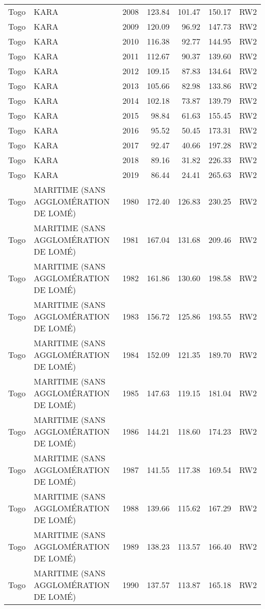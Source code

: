 \begin{longtable}{lllrrrl}
  Togo & KARA & 2008 & 123.84 & 101.47 & 150.17 & RW2 \\ 
  Togo & KARA & 2009 & 120.09 & 96.92 & 147.73 & RW2 \\ 
  Togo & KARA & 2010 & 116.38 & 92.77 & 144.95 & RW2 \\ 
  Togo & KARA & 2011 & 112.67 & 90.37 & 139.60 & RW2 \\ 
  Togo & KARA & 2012 & 109.15 & 87.83 & 134.64 & RW2 \\ 
  Togo & KARA & 2013 & 105.66 & 82.98 & 133.86 & RW2 \\ 
  Togo & KARA & 2014 & 102.18 & 73.87 & 139.79 & RW2 \\ 
  Togo & KARA & 2015 & 98.84 & 61.63 & 155.45 & RW2 \\ 
  Togo & KARA & 2016 & 95.52 & 50.45 & 173.31 & RW2 \\ 
  Togo & KARA & 2017 & 92.47 & 40.66 & 197.28 & RW2 \\ 
  Togo & KARA & 2018 & 89.16 & 31.82 & 226.33 & RW2 \\ 
  Togo & KARA & 2019 & 86.44 & 24.41 & 265.63 & RW2 \\ 
  Togo & MARITIME (SANS AGGLOMÉRATION DE LOMÉ) & 1980 & 172.40 & 126.83 & 230.25 & RW2 \\ 
  Togo & MARITIME (SANS AGGLOMÉRATION DE LOMÉ) & 1981 & 167.04 & 131.68 & 209.46 & RW2 \\ 
  Togo & MARITIME (SANS AGGLOMÉRATION DE LOMÉ) & 1982 & 161.86 & 130.60 & 198.58 & RW2 \\ 
  Togo & MARITIME (SANS AGGLOMÉRATION DE LOMÉ) & 1983 & 156.72 & 125.86 & 193.55 & RW2 \\ 
  Togo & MARITIME (SANS AGGLOMÉRATION DE LOMÉ) & 1984 & 152.09 & 121.35 & 189.70 & RW2 \\ 
  Togo & MARITIME (SANS AGGLOMÉRATION DE LOMÉ) & 1985 & 147.63 & 119.15 & 181.04 & RW2 \\ 
  Togo & MARITIME (SANS AGGLOMÉRATION DE LOMÉ) & 1986 & 144.21 & 118.60 & 174.23 & RW2 \\ 
  Togo & MARITIME (SANS AGGLOMÉRATION DE LOMÉ) & 1987 & 141.55 & 117.38 & 169.54 & RW2 \\ 
  Togo & MARITIME (SANS AGGLOMÉRATION DE LOMÉ) & 1988 & 139.66 & 115.62 & 167.29 & RW2 \\ 
  Togo & MARITIME (SANS AGGLOMÉRATION DE LOMÉ) & 1989 & 138.23 & 113.57 & 166.40 & RW2 \\ 
  Togo & MARITIME (SANS AGGLOMÉRATION DE LOMÉ) & 1990 & 137.57 & 113.87 & 165.18 & RW2 \\ 

\end{longtable}

